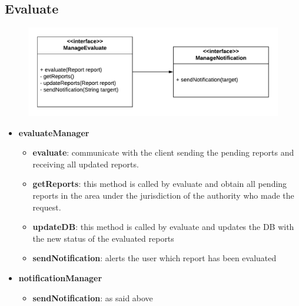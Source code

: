 \documentclass[12pt,a4paper]{report}
\begin{document}
			\subsection{Evaluate}
				\begin{figure}[H]
						\includegraphics[width = \textwidth, center]{evaluateInterface}
						\label{fig: interfaces}
				\end{figure}
				\begin{itemize}
						\item \textbf{evaluateManager}
						\begin{itemize}
							\item \textbf{evaluate}: communicate with the client sending the pending reports and
								receiving all updated reports.
							\item \textbf{getReports}: this method is called by evaluate and obtain all pending
								reports in the area under the jurisdiction of the authority who made the request.
							\item \textbf{updateDB}: this method is called by evaluate and updates the DB with the
								new status of the evaluated reports
							\item \textbf{sendNotification}: alerts the user which report has been evaluated
						\end{itemize}
						\item \textbf{notificationManager}
						\begin{itemize}
							\item \textbf{sendNotification}: as said above
						\end{itemize}
				\end{itemize}
\end{document}
